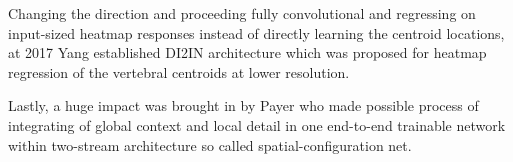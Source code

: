 Changing the direction and proceeding fully convolutional and regressing on input-sized heatmap responses instead of directly learning the centroid locations, at 2017 Yang established DI2IN architecture \cite{Yang2017} which was proposed for heatmap regression of the vertebral centroids at lower resolution. 

Lastly, a huge impact was brought in by Payer \cite{Payer2019} who made possible process of integrating of global context and local detail in one end-to-end trainable network 
within two-stream architecture so called spatial-configuration net. 




